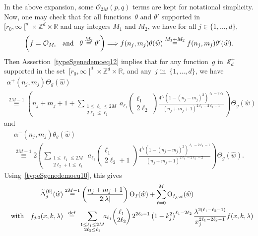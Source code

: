 \documentclass[11pt]{article}
\theoremstyle{definition}
\numberwithin{equation}{section}
\numberwithin{figure}{section}
\numberwithin{table}{section}
\newcommand*\sumetage[2]{\sum_{\substack{{#1}\\{#2}}}}
\newcommand{\lam}{\lambda}
\newcommand{\D}{\Delta}
\newcommand{\wt}{\widetilde}
\newcommand{\wh}{\widehat}
\newcommand*\cO{\mathcal{O}}
\newcommand*\cS{\mathcal{S}}
\newcommand*\R{\mathbb{R}}
\newcommand*\ZZ{\mathbb{Z}}
\newcommand{\andf}{\quad\hbox{and}\quad}
\newcommand{\with}{\quad\hbox{with}\quad}
\newcommand*\eqdefa{\overset{\mathrm{def}}{=}}
\newcommand*\equivH[1]{\overset{#1}{\equiv}}
\begin{document}
In the above expansion, some $\cO_{2M}(p,q)$ terms are kept for notational simplicity. Now, one may check that for all functions~$\theta$ and $\theta'$ supported in~$[r_0,\infty\mathclose{[}^d\times \ZZ^d\times \R$ and any integers $M_1$ and $M_2$, we have for all $j\in\{1,\dots,d\}$,
\begin{equation}\label{typeSgenedemoeq10}
\left(f=\cO_{M_1} \!\andf \! \theta \equivH {M_2} \theta'\right) \Longrightarrow f(n_j,m_j) \theta(\wh w) \equivH {M_1+M_2} f(n_j,m_j) \theta'(\wh w).
\end{equation}
Then Assertion~\eqref{typeSgenedemoeq12} implies that for any function~$g $ in~$\cS_d^+$ supported in the set~$[r_0,\infty\mathclose{[}^d\times \ZZ^d\times \R$, and any~$j$ in~$\{1,\dots,d\}$, we have
\begin{multline}\label{eq:alpha+}
\alpha^+(n_j,m_j) \Theta_g(\wh w) \\
\equivH {2M-1} \left(n_j+m_j+1
+\sumetage {1\leq \ell_1\leq 2M} {2\ell_2\leq \ell_1} \! a_{\ell_1}
\begin{pmatrix} \ell_1 \\ 2\ell_2
\end{pmatrix} \frac {4^{\ell_2} (1-(n_j-m_j)^2)^{\ell_1-2\ell_2} } {(n_j+m_j+1)^{2\ell_1-2\ell_2-1}}\right) \Theta_g(\wh w)
\end{multline}
and
\begin{multline}\label{eq:alpha-}
\alpha^-(n_j,m_j) \theta_g(\wh w) \\ \equivH {2M-1} 2\left(\sumetage {1\leq \ell_1\leq 2M} {2\ell_2+1\leq \ell_1} \!a_{\ell_1}\!
\begin{pmatrix} \ell_1 \\ 2\ell_2\!+\!1
\end{pmatrix} \frac {4^{\ell_2}
\left(1-(n_j-m_j)^2\right)^{\ell_1-2\ell_2-1} } {(n_j\!+\!m_j\!+\!1)^{2\ell_1-2\ell_2-2}}\right) \Theta_g(\wh w).
\end{multline}
Using~\eqref{typeSgenedemoeq10}, this gives
\[
\begin{aligned}
\wt \D_j^{(0)} (\wh w) &\equivH{2M-1} \left(\frac {n_j+m_j+1} {2|\lam|}\right) \Theta_f(\wh w) +\sum_{\ell=0}^M \Theta_{f_{j,2\ell}}(\wh w) \\ \with
f_{j,0} (x,k,\lam) &\;\:\eqdefa\;\, \sumetage {1\leq \ell_1\leq 2M} {2\ell_2\leq \ell_1}\!\! a_{\ell_1}\!
\begin{pmatrix} \ell_1 \\ 2\ell_2
\end{pmatrix} 2^{2\ell_2-1} \left(1-k_j^2\right)^{\ell_1-2\ell_2} \frac { \lam^{2(\ell_1-\ell_2-1)}} {x_j^{2\ell_1-2\ell_2-1}} f(x,k,\lam)
\end{aligned}
\]
\end{document}

